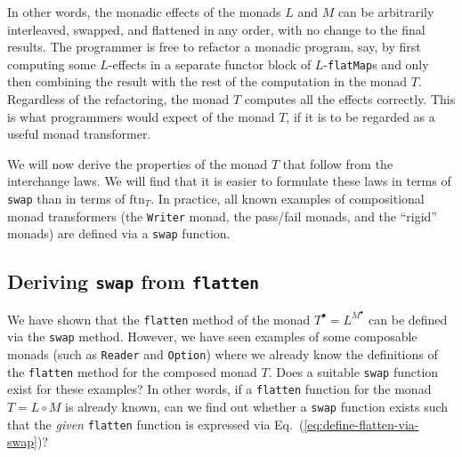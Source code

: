 In other words, the monadic effects of the monads $L$ and $M$ can
be arbitrarily interleaved, swapped, and flattened in any order, with
no change to the final results. The programmer is free to refactor
a monadic program, say, by first computing some $L$-effects in a
separate functor block of $L$-\lstinline!flatMap!s and only then
combining the result with the rest of the computation in the monad
$T$. Regardless of the refactoring, the monad $T$ computes all the
effects correctly. This is what programmers would expect of the monad
$T$, if it is to be regarded as a useful monad transformer.

We will now derive the properties of the monad $T$ that follow from
the interchange laws. We will find that it is easier to formulate
these laws in terms of \lstinline!swap! than in terms of $\text{ftn}_{T}$.
In practice, all known examples of compositional monad transformers
(the \lstinline!Writer! monad, the pass/fail monads, and the \textsf{``}rigid\textsf{''}
monads) are defined via a \lstinline!swap! function.

\subsection{Deriving \texttt{swap} from \texttt{flatten}\label{subsec:Deriving-swap-from-flatten}}

We have shown that the \texttt{}\lstinline!flatten! method of the
monad $T^{\bullet}=L^{M^{\bullet}}$ can be defined via the \texttt{}\lstinline!swap!
method. However, we have seen examples of some composable monads (such
as \texttt{}\lstinline!Reader! and \lstinline!Option!) where we
already know the definitions of the \texttt{}\lstinline!flatten!
method for the composed monad $T$. Does a suitable \texttt{}\lstinline!swap!
function exist for these examples? In other words, if a \texttt{}\lstinline!flatten!
function for the monad $T=L\circ M$ is already known, can we find
out whether a \texttt{}\lstinline!swap! function exists such that
the\emph{ given} \texttt{}\lstinline!flatten! function is expressed
via Eq.~(\ref{eq:define-flatten-via-swap})? 

